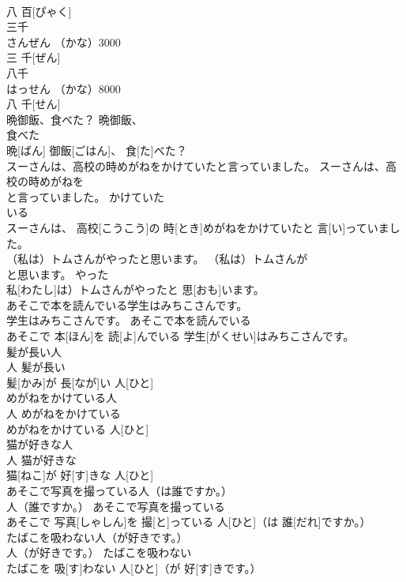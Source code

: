 \documentclass[8pt]{extreport}
\begin{document}
\begin{CJK}{UTF8}{min}
\\	八 百[ぴゃく]	
\\	三千	
\\	さんぜん	（かな）3000	
\\	三 千[ぜん]	
\\	八千	
\\	はっせん	（かな）8000	
\\	八 千[せん]	
\\	晩御飯、食べた？	晩御飯、
\\	食べた	
\\	晩[ばん] 御飯[ごはん]、 食[た]べた？	
\\	スーさんは、高校の時めがねをかけていたと言っていました。	スーさんは、高校の時めがねを
\\	と言っていました。	かけていた	
\\	いる 
\\	スーさんは、 高校[こうこう]の 時[とき]めがねをかけていたと 言[い]っていました。	
\\	（私は）トムさんがやったと思います。	（私は）トムさんが
\\	と思います。	やった	
\\	私[わたし]は）トムさんがやったと 思[おも]います。	
\\	あそこで本を読んでいる学生はみちこさんです。	
\\	学生はみちこさんです。	あそこで本を読んでいる	
\\	あそこで 本[ほん]を 読[よ]んでいる 学生[がくせい]はみちこさんです。	
\\	髪が長い人	
\\	人	髪が長い	
\\	髪[かみ]が 長[なが]い 人[ひと]	
\\	めがねをかけている人	
\\	人	めがねをかけている	
\\	めがねをかけている 人[ひと]	
\\	猫が好きな人	
\\	人	猫が好きな	
\\	猫[ねこ]が 好[す]きな 人[ひと]	
\\	あそこで写真を撮っている人（は誰ですか。）	
\\	人（誰ですか。）	あそこで写真を撮っている	
\\	あそこで 写真[しゃしん]を 撮[と]っている 人[ひと]（は 誰[だれ]ですか。）	
\\	たばこを吸わない人（が好きです。）	
\\	人（が好きです。）	たばこを吸わない	
\\	たばこを 吸[す]わない 人[ひと]（が 好[す]きです。）	

\end{CJK}
\end{document}

